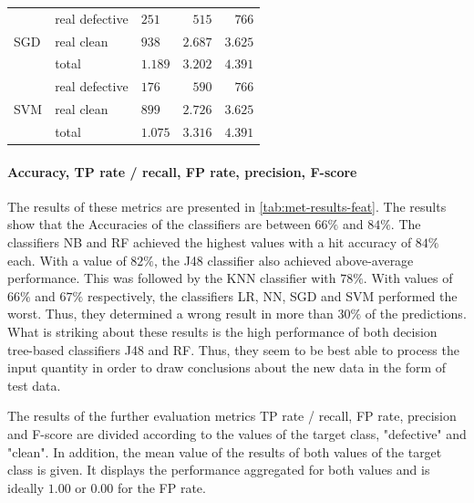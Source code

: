 \begin{table}[t]
\begin{tabular}{@{}lllrr@{}}
\multirow{3}{*}{SGD} & real defective            & $251$    & $515$   & $766$   \\
                     & real clean                & $938$    & $2.687$ & $3.625$ \\
                     & total                     & $1.189$  & $3.202$ & $4.391$ \\ \midrule
\multirow{3}{*}{SVM} & real defective            & $176$    & $590$   & $766$   \\
                     & real clean                & $899$    & $2.726$ & $3.625$ \\
                     & total                     & $1.075$  & $3.316$ & $4.391$ \\ \bottomrule
\end{tabular}
\end{table}

\paragraph{Accuracy, TP rate / recall, FP rate, precision, F-score}

The results of these metrics are presented in \autoref{tab:met-results-feat}. The results show that the Accuracies of the classifiers are between $66\%$ and $84\%$. The classifiers NB and RF achieved the highest values with a hit accuracy of $84\%$ each. With a value of $82\%$, the J48 classifier also achieved above-average performance. This was followed by the KNN classifier with $78\%$. With values of $66\%$ and $67\%$ respectively, the classifiers LR, NN, SGD and SVM performed the worst. Thus, they determined a wrong result in more than $30\%$ of the predictions. What is striking about these results is the high performance of both decision tree-based classifiers J48 and RF. Thus, they seem to be best able to process the input quantity in order to draw conclusions about the new data in the form of test data.

The results of the further evaluation metrics TP rate / recall, FP rate, precision and F-score are divided according to the values of the target class, "defective" and "clean". In addition, the mean value of the results of both values of the target class is given. It displays the performance aggregated for both values and is ideally $1.00$ or $0.00$ for the FP rate.

